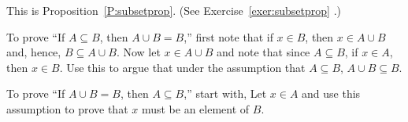 \begin{list}{\bf{\ref{exer42:setstruefalse}.}}
\item \begin{list}{\bf{(a)}}
\item This is Proposition~\ref{P:subsetprop}.  (See Exercise~\ref{exer:subsetprop} .)
\end{list}
\end{list}


\begin{list}{}
\item \begin{list}{\bf{(b)}}
\item To prove ``If $A \subseteq B$, then $A \cup B = B$,'' first note that if $x \in B$, then 
$x \in A \cup B$ and, hence, $B \subseteq A \cup B$.  Now let $x \in A \cup B$ and note that since $A \subseteq B$, if $x \in A$, then $x \in B$.  Use this to argue that under the assumption that $A \subseteq B$, $A \cup B \subseteq B$.

To prove ``If $A \cup B = B$, then $A \subseteq B$,'' start with,  Let $x \in A$ and use this assumption to prove that $x$ must be an element of $B$.
\end{list}
\end{list}

\hbreak
\renewcommand{\labelenumi}{\textbf{\arabic{enumi}.}}

\endinput

